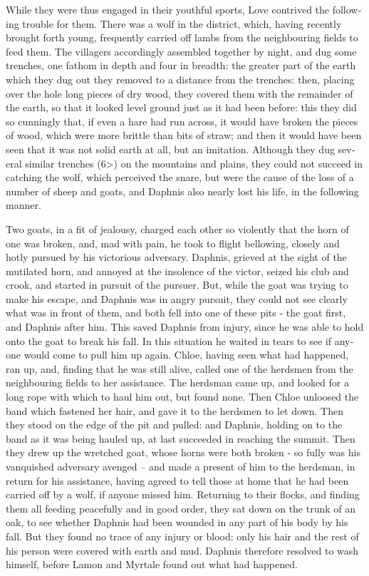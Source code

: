 \documentclass{book}
\begin{document}
\begin{pairs}
\begin{Rightside}
\begin{english}
  While they were thus engaged in their youthful sports, Love contrived the following trouble for them.  There was a wolf in the district, which, having recently brought forth young, frequently carried off lambs from the neighbouring fields to feed them.  The villagers accordingly assembled together by night, and dug some trenches, one fathom in depth and four in breadth: the greater part of the earth which they dug out they removed to a distance from the trenches: then, placing over the hole long pieces of dry wood, they covered them with the remainder of the earth, so that it looked level ground just as it had been before: this they did so cunningly that, if even a hare had run across, it would have broken the pieces of wood, which were more brittle than bits of straw; and then it would have been seen that it was not solid earth at all, but an imitation.  Although they dug several similar trenches (6>) on the mountains and plains, they could not succeed in catching the wolf, which perceived the snare, but were the cause of the loss of a number of sheep and goats, and Daphnis also nearly lost his life, in the following manner.
\pend


  Two goats, in a fit of jealousy, charged each other so violently that the horn of one was broken, and, mad with pain, he took to flight bellowing, closely and hotly pursued by his victorious adversary.  Daphnis, grieved at the sight of the mutilated horn, and annoyed at the insolence of the victor, seized his club and crook, and started in pursuit of the pursuer.  But, while the goat was trying to make his escape, and Daphnis was in angry pursuit, they could not see clearly what was in front of them, and both fell into one of these pits - the goat first, and Daphnis after him.  This saved Daphnis from injury, since he was able to hold onto the goat to break his fall.  In this situation he waited in tears to see if anyone would come to pull him up again.  Chloe, having seen what had happened, ran up, and, finding that he was still alive, called one of the herdsmen from the neighbouring fields to her assistance.  The herdsman came up, and looked for a long rope with which to haul him out, but found none.  Then Chloe unloosed the band which fastened her hair, and gave it to the herdsmen to let down.  Then they stood on the edge of the pit and pulled: and Daphnis, holding on to the band as it was being hauled up, at last succeeded in reaching the summit.  Then they drew up the wretched goat, whose horns were both broken - so fully was his vanquished adversary avenged – and made a present of him to the herdsman, in return for his assistance, having agreed to tell those at home that he had been carried off by a wolf, if anyone missed him.  Returning to their flocks, and finding them all feeding peacefully and in good order, they sat down on the trunk of an oak, to see whether Daphnis had been wounded in any part of his body by his fall.  But they found no trace of any injury or blood: only his hair and the rest of his person were covered with earth and mud.  Daphnis therefore resolved to wash himself, before Lamon and Myrtale found out what had happened.
\pend



\end{english}
\end{Rightside}
\end{pairs}
\end{document}

